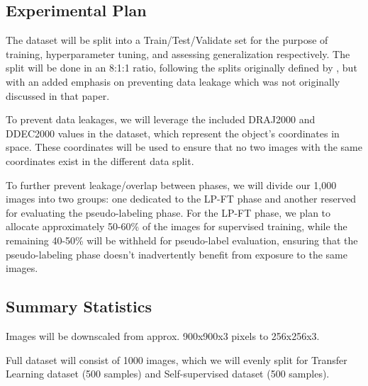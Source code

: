 \documentclass{article}
\begin{document}
\subsection{Experimental Plan}
The dataset will be split into a Train/Test/Validate set for the purpose of training, hyperparameter tuning, and assessing generalization respectively. The split will be done in an 8:1:1 ratio, following the splits originally defined by \cite{awangiskandar2020}, but with an added emphasis on preventing data leakage which was not originally discussed in that paper.

To prevent data leakages, we will leverage the included DRAJ2000 and DDEC2000 values in the dataset, which represent the object's coordinates in space. These coordinates will be used to ensure that no two images with the same coordinates exist in the different data split. 

To further prevent leakage/overlap between phases, we will divide our 1,000 images into two groups: one dedicated to the LP-FT phase and another reserved for evaluating the pseudo-labeling phase. For the LP-FT phase, we plan to allocate approximately 50-60\% of the images for supervised training, while the remaining 40-50\% will be withheld for pseudo-label evaluation, ensuring that the pseudo-labeling phase doesn’t inadvertently benefit from exposure to the same images.


\newpage
\subsection{Summary Statistics}
Images will be downscaled from approx. 900x900x3 pixels to 256x256x3.

Full dataset will consist of 1000 images, which we will evenly split for Transfer Learning dataset (500 samples) and Self-supervised dataset (500 samples).
\end{document}
